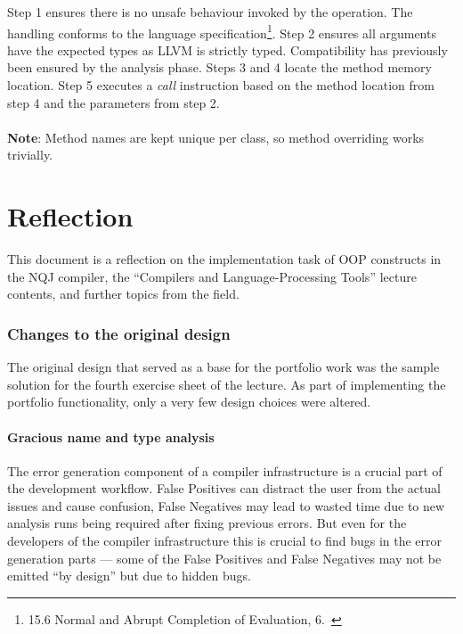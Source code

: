 \documentclass[]{tukportfolio}
\begin{document}
Step 1 ensures there is no unsafe behaviour invoked by the operation. The handling conforms to the language specification\footnote{
  15.6 Normal and Abrupt Completion of Evaluation, 6.~\cite{javaspec}
}. Step 2 ensures all arguments have the expected types as LLVM is strictly typed. Compatibility has previously been ensured by the analysis phase. Steps 3 and 4 locate the method memory location. Step 5 executes a \textit{call} instruction based on the method location from step 4 and the parameters from step 2.
\\
\\
\textbf{Note}: Method names are kept unique per class, so method overriding works trivially.

\newpage

\part*{Reflection}

This document is a reflection on the implementation task of OOP constructs in the NQJ compiler, the ``Compilers and Language-Processing Tools'' lecture contents, and further topics from the field.

\section{Changes to the original design}

The original design that served as a base for the portfolio work was the sample solution for the fourth exercise sheet of the lecture. As part of implementing the portfolio functionality, only a very few design choices were altered.

\subsection{Gracious name and type analysis}

The error generation component of a compiler infrastructure is a crucial part of the development workflow. False Positives can distract the user from the actual issues and cause confusion, False Negatives may lead to wasted time due to new analysis runs being required after fixing previous errors. But even for the developers of the compiler infrastructure this is crucial to find bugs in the error generation parts --- some of the False Positives and False Negatives may not be emitted ``by design'' but due to hidden bugs.
\end{document}
